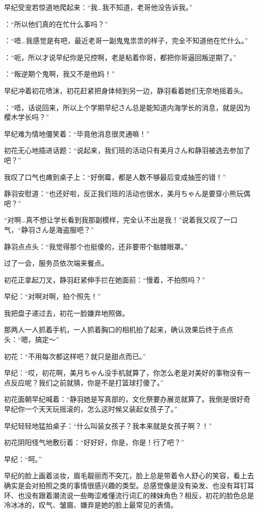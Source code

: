 早纪受宠若惊道地爬起来：“我…我不知道，老哥他没告诉我。”

\jelly：“所以他们真的在忙什么事吗？”

\saki：“唔…我感觉是有吧，最近老哥一副鬼鬼祟祟的样子，完全不知道他在忙什么。”

\ichika：“呃，所以才说早纪你是兄控啊，老是粘着你哥，都把你哥逼回叛逆期了。”

\saki：“叛逆期个鬼啊，我又不是他妈！”

早纪冲着初花喷沫，初花赶紧把身体倾到另一边，静羽看着她们无奈地摇着头。

\jelly：“唔，话说回来，所以上个学期早纪さん总是能知道内海学长的消息，就是因为樱木学长吗？”

早纪难为情地僵笑着：“毕竟他消息很灵通嘛！”

初花无心地插进话题：“说起来，我们班的活动只有美月さん和静羽被选去参加了吧？”

我叹了口气也瘫到桌子上：“好倒霉，都是人数不够最后变成抽签的错！”

静羽安慰道：“也还好啦，反正我们班的活动也很水，美月ちゃん是要穿小熊玩偶吧？”

“对啊…真不想让学长看到我那副模样，完全认不出是我！”说着我又叹了一口气，“静羽さん是海盗服吧？”

静羽点点头：“我觉得那个也挺傻的，还非要带个骷髅眼罩。”

过了一会，服务员依次端来餐点。

初花正拿起刀叉，静羽赶紧伸手拦在她面前：“慢着，不拍照吗？”

早纪：“对啊对啊，拍个照先！”

我把盘子递过去，初花一脸嫌弃地照做。

那两人一人抓着手机，一人抓着胸口的相机拍了起来，确认效果后终于点点头：“嗯，搞定～”

初花：“不用每次都这样吧？就只是甜点而已。”

早纪：“哎，初花啊，美月ちゃん没手机就算了，你怎么老是对美好的事物没有一点反应呢？我们之前就猜，你是不是打篮球打傻了。”

初花面朝早纪喊着：“静羽她是写真部的，文化祭要办展览就算了。我倒是很好奇早纪你一个天天玩摇滚的，怎么这时候又装起女孩子了。”

早纪轻轻地猛拍桌子：“什么叫装女孩子？我本来就是女孩子啊？！”

初花阴阳怪气地敷衍着：“好好好，你是，你是！行了吧？”

早纪：“呵。”

早纪的脸上画着淡妆，眉毛靓丽而不突兀，脸上总是带着令人舒心的笑容，看上去确实是会对拍照之类的事情很感兴趣的类型。总感觉像是没有染发、也没有耳钉耳环、也没有跟着潮流说一些晦涩难懂流行词汇的辣妹角色？相反，初花的脸色总是冷冰冰的，叹气、皱眉、嫌弃是她的脸上最常见的表情。

